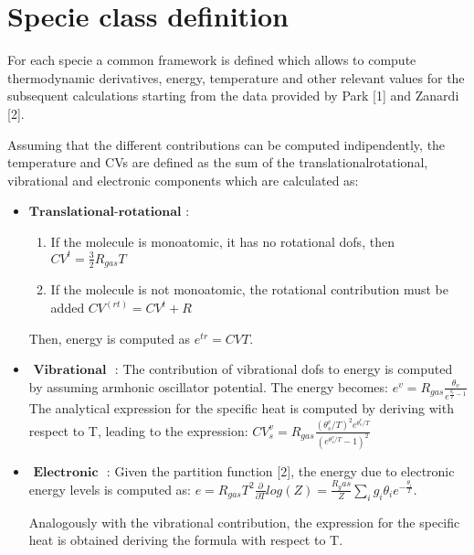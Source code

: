 \documentclass[letterpaper,10pt,english]{jupyterBook}
\begin{document}
\chapter{Specie class definition}
\label{\detokenize{1_Temperature/Specie_class_definition:specie-class-definition}}\label{\detokenize{1_Temperature/Specie_class_definition::doc}}
\sphinxAtStartPar
For each specie a common framework is defined which allows to compute thermodynamic derivatives, energy, temperature and other relevant values for the subsequent calculations starting from the data provided by Park {[}1{]} and Zanardi {[}2{]}.

\sphinxAtStartPar
Assuming that the different contributions can be computed indipendently, the temperature and CVs are defined as the sum of the translational\sphinxhyphen{}rotational, vibrational and electronic components which are calculated as:
\begin{itemize}
\item {} 
\sphinxAtStartPar
\( \textbf{Translational-rotational}\) :
\begin{enumerate}
%
\item {} 
\sphinxAtStartPar
If the molecule is monoatomic, it has no rotational dofs, then \( CV^t = \frac{3}{2} R_{gas} T \)

\item {} 
\sphinxAtStartPar
If the molecule is not monoatomic, the rotational contribution must be added \( CV^{(rt)} = CV^t + R \)

\end{enumerate}

\sphinxAtStartPar
Then, energy is computed as \(e^{tr} = CV  T\).

\item {} 
\sphinxAtStartPar
\( \textbf{ Vibrational }\) :
The contribution of vibrational dofs to energy is computed by assuming armhonic oscillator potential. The energy becomes: \(e^{v} = R_{gas} \frac{\theta_v}{e^{\frac{\theta_v}{T}-1}} \) 
The analytical expression for the specific heat is computed by deriving with respect to T, leading to the expression: 
\( CV^{v}_s = R_{gas} \frac{(\theta^v_s/T)^2 e^{\theta^v_s/T}} {(e^{\theta^v_s/T}-1)^2} \)

\item {} 
\sphinxAtStartPar
\( \textbf{ Electronic } \) :
Given the partition function {[}2{]}, the energy due to electronic energy levels is computed as: \( e = R_{gas}T^2 \frac{\partial}{\partial T} log(Z) = \frac{R_gas}{Z} \sum_i g_i \theta_i e^{-\frac{\theta_i}{T}}\).

\sphinxAtStartPar
Analogously with the vibrational contribution, the expression for the specific heat is obtained deriving the formula with respect to T.

\end{itemize}
\end{document}
